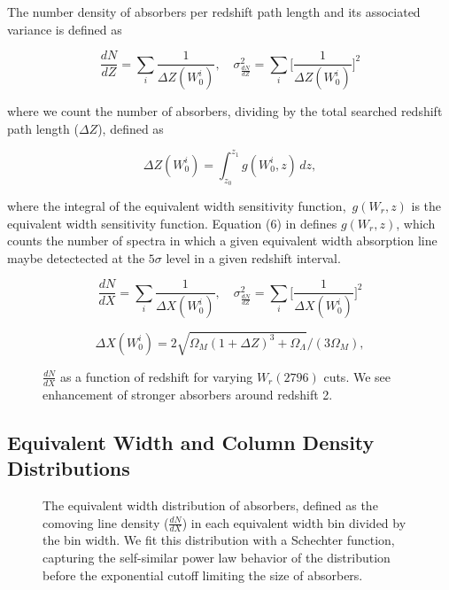 \message{ !name(Paper_v1.tex)}\documentclass[iop,apj,numberedappendix,appendixfloats,twocolappendix]{emulateapj}
\begin{document}
The number density of {\MgII} absorbers per redshift path length and its associated variance is defined as

\begin{equation}
\frac{d N}{d Z} = \sum_{i}\frac{1}{\Delta Z(W_0^i)},\quad \sigma^2_{\frac{d N}{d Z}} = \sum_{i} \Big[\frac{1}{\Delta Z(W_0^i)}\Big]^2
\label{eqn:dndz}
\end{equation}

where we count the number of {\MgII} absorbers, dividing by the total searched redshift path length ($\Delta Z$), defined as

\begin{equation}
\Delta Z(W_0^i) = \int_{z_0}^{z_1} g(W_0^i, z)\,dz,
\label{eqn:deltaz}
\end{equation}

where  the integral of the equivalent width sensitivity function,\ $g(W_r, z)$ is the equivalent width sensitivity function. Equation (6) in \cite{Lanzetta1987} defines $g(W_r, z)$, which counts the number of spectra in which a given equivalent width absorption line maybe detectected at the $5\sigma$ level in a given redshift interval. 

\begin{equation}
\frac{d N}{d X} = \sum_{i}\frac{1}{\Delta X(W_0^i)},\quad \sigma^2_{\frac{d N}{d Z}} = \sum_{i} \Big[\frac{1}{\Delta X(W_0^i)}\Big]^2
\label{eqn:dndx}
\end{equation}

\begin{equation}
\Delta X(W_0^i) = 2 \sqrt{\Omega_M (1 + \Delta Z)^3 + \Omega_{\Lambda}} / (3 \Omega_M),
\label{eqn:deltax}
\end{equation}

\begin{figure*}[bth]
\caption{$\frac{dN}{dX}$ as a function of redshift for varying $W_r(2796)$ cuts. We see enhancement of stronger {\MgII} absorbers around redshift 2.}
\label{fig:dndx_cuts}
\end{figure*}

\subsection{Equivalent Width and Column Density Distributions}
\label{fwfn}



\begin{figure*}[bth]
\caption{The equivalent width distribution of {\MgII} absorbers, defined as the comoving line density ($\frac{dN}{dX}$) in each equivalent width bin divided by the bin width. We fit this distribution with a Schechter function, capturing the self-similar power law behavior of the distribution before the exponential cutoff limiting the size of {\MgII} absorbers.}
\label{fig:dndx_cuts}
\end{figure*}
\end{document}
